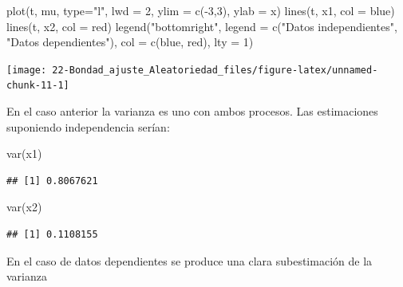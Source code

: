 \documentclass[
]{book}
\newenvironment{Shaded}{\begin{snugshade}}{\end{snugshade}}
\newcommand{\AttributeTok}[1]{\textcolor[rgb]{0.77,0.63,0.00}{#1}}
\newcommand{\DecValTok}[1]{\textcolor[rgb]{0.00,0.00,0.81}{#1}}
\newcommand{\FunctionTok}[1]{\textcolor[rgb]{0.00,0.00,0.00}{#1}}
\newcommand{\NormalTok}[1]{#1}
\newcommand{\SpecialCharTok}[1]{\textcolor[rgb]{0.00,0.00,0.00}{#1}}
\newcommand{\StringTok}[1]{\textcolor[rgb]{0.31,0.60,0.02}{#1}}
\theoremstyle{break}
\theoremstyle{definition}
\theoremstyle{definition}
\theoremstyle{definition}
\theoremstyle{definition}
\theoremstyle{remark}
\begin{document}
\begin{Shaded}
\begin{Highlighting}[]
\FunctionTok{plot}\NormalTok{(t, mu, }\AttributeTok{type=}\StringTok{"l"}\NormalTok{, }\AttributeTok{lwd =} \DecValTok{2}\NormalTok{, }\AttributeTok{ylim =} \FunctionTok{c}\NormalTok{(}\SpecialCharTok{{-}}\DecValTok{3}\NormalTok{,}\DecValTok{3}\NormalTok{), }\AttributeTok{ylab =} \StringTok{\textquotesingle{}x\textquotesingle{}}\NormalTok{)}
\FunctionTok{lines}\NormalTok{(t, x1, }\AttributeTok{col =} \StringTok{\textquotesingle{}blue\textquotesingle{}}\NormalTok{)}
\FunctionTok{lines}\NormalTok{(t, x2, }\AttributeTok{col =} \StringTok{\textquotesingle{}red\textquotesingle{}}\NormalTok{)}
\FunctionTok{legend}\NormalTok{(}\StringTok{"bottomright"}\NormalTok{, }\AttributeTok{legend =} \FunctionTok{c}\NormalTok{(}\StringTok{"Datos independientes"}\NormalTok{, }\StringTok{"Datos dependientes"}\NormalTok{), }\AttributeTok{col =} \FunctionTok{c}\NormalTok{(}\StringTok{\textquotesingle{}blue\textquotesingle{}}\NormalTok{, }\StringTok{\textquotesingle{}red\textquotesingle{}}\NormalTok{), }\AttributeTok{lty =} \DecValTok{1}\NormalTok{)}
\end{Highlighting}
\end{Shaded}

\begin{center}\texttt{[image: 22-Bondad\_ajuste\_Aleatoriedad\_files/figure-latex/unnamed-chunk-11-1]} \end{center}

En el caso anterior la varianza es uno con ambos procesos.
Las estimaciones suponiendo independencia serían:

\begin{Shaded}
\begin{Highlighting}[]
\FunctionTok{var}\NormalTok{(x1)}
\end{Highlighting}
\end{Shaded}

\begin{verbatim}
## [1] 0.8067621
\end{verbatim}

\begin{Shaded}
\begin{Highlighting}[]
\FunctionTok{var}\NormalTok{(x2)}
\end{Highlighting}
\end{Shaded}

\begin{verbatim}
## [1] 0.1108155
\end{verbatim}

En el caso de datos dependientes se produce una clara subestimación de la varianza
\end{document}
